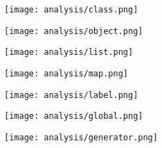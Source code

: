 \begin{center}
\texttt{[image: analysis/class.png]} 
\end{center}
\pagebreak

\begin{multicols}{2}
\begin{center}
\texttt{[image: analysis/object.png]} 
\end{center}
\columnbreak
\begin{center}
\texttt{[image: analysis/list.png]} 
\end{center}
\end{multicols}

\begin{multicols}{2}
\begin{center}
\texttt{[image: analysis/map.png]} 
\end{center}
\columnbreak
\begin{center}
\texttt{[image: analysis/label.png]} 
\end{center}
\end{multicols}

\begin{multicols}{2}
\begin{center}
\texttt{[image: analysis/global.png]} 
\end{center}
\columnbreak
\begin{center}
\texttt{[image: analysis/generator.png]} 
\end{center}
\end{multicols}

